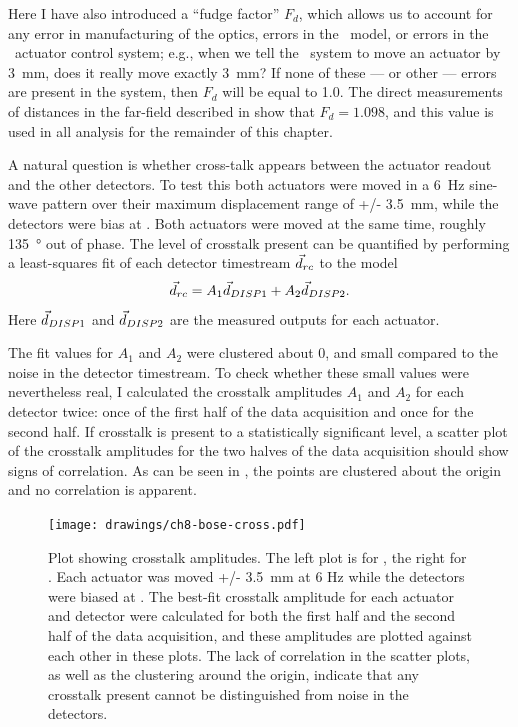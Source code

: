 Here I have also introduced a ``fudge factor'' $F_d$, which allows us to account for any error in manufacturing of the optics, errors in the \ZEMAX\ model, or errors in the \BOSE\ actuator control system; e.g., when we tell the \BOSE\ system to move an actuator by \SI{3}{\mm}, does it really move exactly \SI{3}{\mm}?
If none of these --- or other --- errors are present in the system, then $F_d$ will be equal to 1.0.
The direct measurements of distances in the far-field described in  show that $F_d = 1.098$, and this value is used in all analysis for the remainder of this chapter.


A natural question is whether cross-talk appears between the actuator readout and the other detectors.
To test this both actuators were moved in a \SI{6}{\Hz} sine-wave pattern over their maximum displacement range of +/- 3.5~mm, while the detectors were bias at \SOC.
Both actuators were moved at the same time, roughly \SI{135}{\degree} out of phase.
The level of crosstalk present can be quantified by performing a least-squares fit of each detector timestream $\vec{d}_{rc}$ to the model
\begin{equation}
	 \vec{d}_{rc} = A_1 \vec{d}_{{\small DISP{1}}} + A_2 \vec{d}_{{\small DISP{2}}}.
\end{equation}
Here $\vec{d}_{{\small DISP{1}}}$ and $\vec{d}_{{\small DISP{2}}}$ are the measured outputs for each actuator.

The fit values for $A_1$ and $A_2$ were clustered about 0, and small compared to the noise in the detector timestream.
To check whether these small values were nevertheless real, I calculated the crosstalk amplitudes $A_1$ and $A_2$ for each detector twice: once of the first half of the data acquisition and once for the second half.
If crosstalk is present to a statistically significant level, a scatter plot of the crosstalk amplitudes for the two halves of the data acquisition should show signs of correlation.
As can be seen in , the points are clustered about the origin and no correlation is apparent.

\begin{figure}
\centering
\texttt{[image: drawings/ch8-bose-cross.pdf]}
\caption{
Plot showing crosstalk amplitudes.
The left plot is for , the right for .
Each actuator was moved +/- \SI{3.5}{\mm} at 6 Hz while the detectors were biased at \SOC.
The best-fit crosstalk amplitude for each actuator and detector were calculated for both the first half and the second half of the data acquisition, and these amplitudes are plotted against each other in these plots.
The lack of correlation in the scatter plots, as well as the clustering around the origin, indicate that any crosstalk present cannot be distinguished from noise in the detectors.
}
\label{fig:ch8-bose-cross}
\end{figure}

